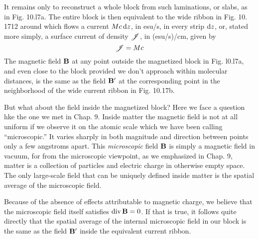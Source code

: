 It remains only to reconstruct a whole block from such 
laminations, or slabs, as in Fig. 10.l7a. The entire block is then equivalent
to the wide ribbon in Fig. 10. 1712 around which flows a current $Mc \operatorname{d\!} z$,
in esu/s, in every strip $\operatorname{d\!} z$, or, stated more simply, a surface current
of density $\mathscr{J}$, in (esu/s)/cm, given by
\begin{equation}
  \mathscr{J} = Mc
\end{equation}
The magnetic field $\mathbf{B}$ at any point outside the magnetized block in
Fig. l0.l7a, and even close to the block provided we don't approach
within molecular distances, is the same as the field $\mathbf{B}'$ at the corresponding
point in the neighborhood of the wide current ribbon in
Fig. 10.17b.

But what about the field inside the magnetized block? Here we
face a question hke the one we met in Chap. 9. Inside matter the
magnetic field is not at all uniform if we observe it on the atomic
scale which we have been calling ``microscopic.'' It varies sharply
in both magnitude and direction between points only a few angstroms
apart. This \emph{microscopic} field $\mathbf{B}$ is simply a magnetic field in vacuum,
for from the microscopic viewpoint, as we emphasized in Chap. 9,
matter is a collection of particles and electric charge in otherwise
empty space. The only large-scale field that can be uniquely defined
inside matter is the spatial average of the microscopic field.

Because of the absence of effects attributable to magnetic charge,
we believe that the microscopic field itself satisfies $\operatorname{div}\mathbf{B} = 0$. If that
is true, it follows quite directly that the spatial average of the internal
microscopic field in our block is the same as the field $\mathbf{B}'$ inside the
equivalent current ribbon.

